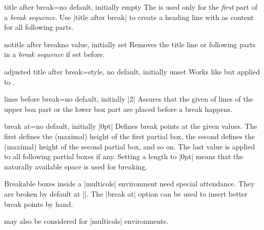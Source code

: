 \begin{docTcbKey}{title after break}{=}{no default, initially empty}
  The  is used only for the \emph{first} part of a
  \emph{break sequence}. Use |title after break| to create a heading line
  with  as content for all following parts.
\end{docTcbKey}


\begin{docTcbKey}{notitle after break}{}{no value, initially set}
  Removes the title line or following parts in a  \emph{break sequence} if set before.
\end{docTcbKey}


\begin{docTcbKey}{adjusted title after break}{=}{style, no default, initially unset}
  Works like  but applied to .
\end{docTcbKey}


\begin{docTcbKey}{lines before break}{=}{no default, initially |2|}
  Assures that the given  of lines of the upper box part or
  the lower box part are placed before a break happens.
\end{docTcbKey}

\clearpage
\begin{docTcbKey}{break at}{=}{no default, initially |0pt|}
  Defines break points at the given  values.
  The first  defines the (maximal) height of the first partial box,
  the second  defines the (maximal) height of the second partial box,
  and so on. The last  value is applied to all following partial boxes if any.
  Setting a length to |0pt| means that the naturally available space is used
  for breaking.
\begin{dispExample}
\begin{multicols}{3}\footnotesize
Breakable boxes inside a |multicols| environment need special attendance.
They are broken by default at |\textheight|.
The |break at| option can be used to insert better break points by hand.
\begin{tcolorbox}[enhanced jigsaw,size=small,vfill before first,
  colframe=red,colback=yellow!10!white,before title=\raggedright,
  title={Broken box inside a |multicols| environment},fonttitle=\bfseries,
  enforce breakable,%
  pad at break=1mm,break at=3cm/6.3cm ]
\lipsum[1]
\end{tcolorbox}
 may also be considered for |multicols| environments.
\end{multicols}
\end{dispExample}
\end{docTcbKey}


